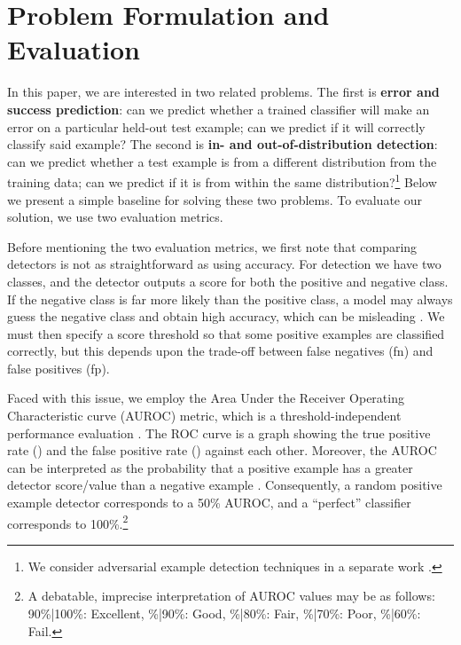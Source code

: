 \documentclass{article}
\begin{document}
\section{Problem Formulation and Evaluation}
In this paper, we are interested in two related problems. The first is \textbf{error and success prediction}: can we predict whether a trained classifier will make an error on a particular held-out test example; can we predict if it will correctly classify said example? The second is \textbf{in- and out-of-distribution detection}: can we predict whether a test example is from a different distribution from the training data; can we predict if it is from within the same distribution?\footnote{We consider adversarial example detection techniques in a separate work \citep{detectadversarial}.} Below we present a simple baseline for solving these two problems. To evaluate our solution, we use two evaluation metrics.

Before mentioning the two evaluation metrics, we first note that comparing detectors is not as straightforward as using accuracy. For detection we have two classes, and the detector outputs a score for both the positive and negative class. If the negative class is far more likely than the positive class, a model may always guess the negative class and obtain high accuracy, which can be misleading \citep{provost}. We must then specify a score threshold so that some positive examples are classified correctly, but this depends upon the trade-off between false negatives (fn) and false positives (fp).

Faced with this issue, we employ the Area Under the Receiver Operating Characteristic curve (AUROC) metric, which is a threshold-independent performance evaluation \citep{auroc}. The ROC curve is a graph showing the true positive rate () and the false positive rate () against each other. Moreover, the AUROC can be interpreted as the probability that a positive example has a greater detector score/value than a negative example \citep{ROC}. Consequently, a random positive example detector corresponds to a 50\% AUROC, and a ``perfect'' classifier corresponds to 100\%.\footnote{A debatable, imprecise interpretation of AUROC values may be as follows: 90\%|100\%: Excellent, \%|90\%: Good, \%|80\%: Fair, \%|70\%: Poor, \%|60\%: Fail.}
\end{document}
